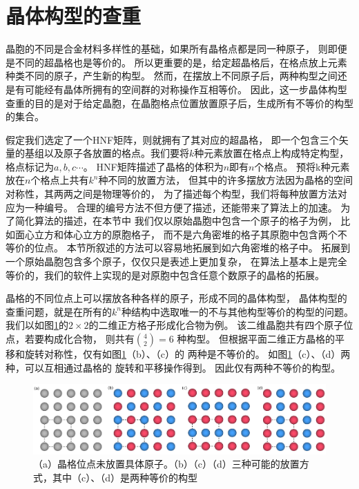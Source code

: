 \section{晶体构型的查重}
晶胞的不同是合金材料多样性的基础，如果所有晶格点都是同一种原子，
则即便是不同的超晶格也是等价的。
所以更重要的是，给定超晶格后，在格点放上元素种类不同的原子，产生新的构型。
然而，在摆放上不同原子后，两种构型之间还是有可能经有晶体所拥有的空间群的对称操作互相等价。
因此，这一步晶体构型查重的目的是对于给定晶胞，在晶胞格点位置放置原子后，生成所有不等价的构型的集合。

假定我们选定了一个HNF矩阵，则就拥有了其对应的超晶格，
即一个包含三个矢量的基组以及原子各放置的格点。我们要将$k$种元素放置在格点上构成特定构型，
格点标记为$a,b,c \cdots$。
HNF矩阵描述了晶格的体积为$n$即有$n$个格点。
预将k种元素放在$n$个格点上共有$k^n$种不同的放置方法，
但其中的许多摆放方法因为晶格的空间对称性，其两两之间是物理等价的，
为了描述每个构型，我们将每种放置方法对应为一种编号。
合理的编号方法不但方便了描述，还能带来了算法上的加速。 
为了简化算法的描述，在本节中
我们仅以原始晶胞中包含一个原子的格子为例，
比如面心立方和体心立方的原胞格子，
而不是六角密堆的格子其原胞中包含两个不等价的位点。
本节所叙述的方法可以容易地拓展到如六角密堆的格子中\cite{hart2009generating}。
拓展到一个原始晶胞包含多个原子，仅仅只是表述上更加复杂，
在算法上基本上是完全等价的，我们的软件上实现的是对原胞中包含任意个数原子的晶格的拓展。

晶格的不同位点上可以摆放各种各样的原子，形成不同的晶体构型，
晶体构型的查重问题，就是在所有的$k^n$种结构中选取唯一的不与其他构型等价的构型的问题。
我们以如图\ref{fig:cell-undup}的$2 \times 2$的二维正方格子形成化合物为例。
该二维晶胞共有四个原子位点，若要构成化合物，
则共有${4\choose 2}=6$ 种构型。
但根据平面二维正方晶格的平移和旋转对称性，仅有如图\ref{fig:cell-undup}（b）、（c）的
两种是不等价的。
如图\ref{fig:cell-undup}（c）、（d）两种，可以互相通过晶格的
旋转和平移操作得到。
因此仅有两种不等价的构型。

\begin{figure}[htb]
  \includegraphics[width=1.0\textwidth]{figs/cell_undup.png}
  \centering
  \caption{（a）晶格位点未放置具体原子。（b）（c）（d）三种可能的放置方式，其中（c）、（d）是两种等价的构型}
  \label{fig:cell-undup}
\end{figure}

